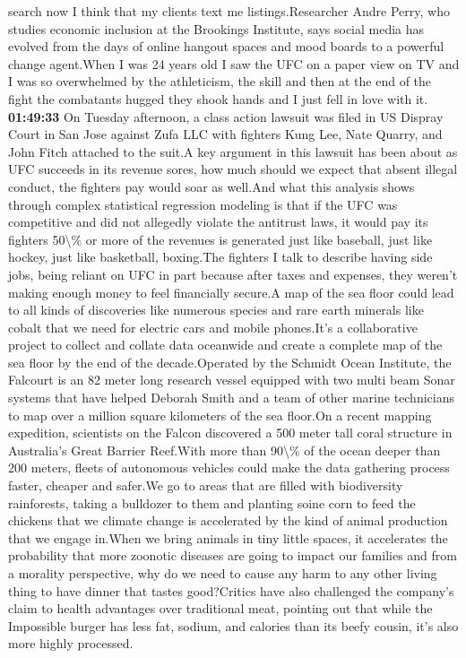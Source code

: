 \documentclass{article}%
\begin{document}
search now I think that my clients text me listings.Researcher Andre Perry, who studies economic inclusion at the Brookings Institute, says social media has evolved from the days of online hangout spaces and mood boards to a powerful change agent.When I was 24 years old I saw the UFC on a paper view on TV and I was so overwhelmed by the athleticism, the skill and then at the end of the fight the combatants hugged they shook hands and I just fell in love with it.%
\textbf{01:49:33}%
\newline%
On Tuesday afternoon, a class action lawsuit was filed in US Dispray Court in San Jose against Zufa LLC with fighters Kung Lee, Nate Quarry, and John Fitch attached to the suit.A key argument in this lawsuit has been about as UFC succeeds in its revenue sores, how much should we expect that absent illegal conduct, the fighters pay would soar as well.And what this analysis shows through complex statistical regression modeling is that if the UFC was competitive and did not allegedly violate the antitrust laws, it would pay its fighters 50\textbackslash{}\% or more of the revenues is generated just like baseball, just like hockey, just like basketball, boxing.The fighters I talk to describe having side jobs, being reliant on UFC in part because after taxes and expenses, they weren't making enough money to feel financially secure.A map of the sea floor could lead to all kinds of discoveries like numerous species and rare earth minerals like cobalt that we need for electric cars and mobile phones.It's a collaborative project to collect and collate data oceanwide and create a complete map of the sea floor by the end of the decade.Operated by the Schmidt Ocean Institute, the Falcourt is an 82 meter long research vessel equipped with two multi beam Sonar systems that have helped Deborah Smith and a team of other marine technicians to map over a million square kilometers of the sea floor.On a recent mapping expedition, scientists on the Falcon discovered a 500 meter tall coral structure in Australia's Great Barrier Reef.With more than 90\textbackslash{}\% of the ocean deeper than 200 meters, fleets of autonomous vehicles could make the data gathering process faster, cheaper and safer.We go to areas that are filled with biodiversity rainforests, taking a bulldozer to them and planting soine corn to feed the chickens that we climate change is accelerated by the kind of animal production that we engage in.When we bring animals in tiny little spaces, it accelerates the probability that more zoonotic diseases are going to impact our families and from a morality perspective, why do we need to cause any harm to any other living thing to have dinner that tastes good?Critics have also challenged the company's claim to health advantages over traditional meat, pointing out that while the Impossible burger has less fat, sodium, and calories than its beefy cousin, it's also more highly processed.%
\end{document}
